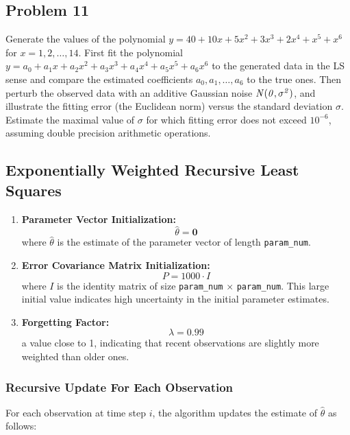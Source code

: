 \subsection{Problem 11}%
\label{sec:problem_11}
Generate the values of the polynomial $y = 40 + 10x + 5x^2 + 3x^3 + 2x^4 + x^5 + x^6$
for $x = 1, 2, \ldots, 14$.
First fit the polynomial $y = a_0 + a_1x + a_2x^2 + a_3x^3 + a_4x^4 + a_5x^5 + a_6x^6$
to the generated data in the LS sense and compare the estimated coefficients
$a_0, a_1, \ldots, a_6$ to the true ones.
Then perturb the observed data with an additive Gaussian noise $\it{N}(0,\sigma^2)$, and
illustrate the fitting error (the Euclidean norm) versus the standard deviation $\sigma$.
Estimate the maximal value of $\sigma$ for which fitting error does not exceed $10^{-6}$,
assuming double precision arithmetic operations.
\subsection*{Exponentially Weighted Recursive Least Squares}
\begin{enumerate}
    \item \textbf{Parameter Vector Initialization:}
    \[ \hat{\theta} = \mathbf{0} \]
    where \( \hat{\theta} \) is the estimate of the parameter vector of length \texttt{param\_num}.
    
    \item \textbf{Error Covariance Matrix Initialization:}
    \[ P = 1000 \cdot I \]
    where \( I \) is the identity matrix of size \texttt{param\_num} $\times$ \texttt{param\_num}. This large initial value indicates high uncertainty in the initial parameter estimates.
    
    \item \textbf{Forgetting Factor:}
    \[ \lambda = 0.99 \]
    a value close to 1, indicating that recent observations are slightly more weighted than older ones.
\end{enumerate}

\subsubsection*{Recursive Update For Each Observation}

For each observation at time step \(i\), the algorithm updates the estimate of \( \hat{\theta} \) as follows:

